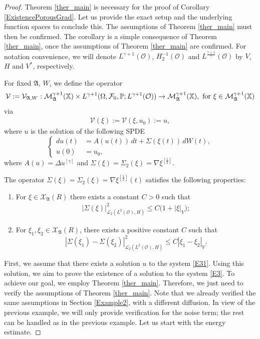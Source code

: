 \documentclass[english,a4paper,11pt]{amsart}
\theoremstyle{plain}
\theoremstyle{definition}
\theoremstyle{remark}
\numberwithin{equation}{section}
\newcommand{\MA}{\mathfrak{A}}
\newcommand{\CO}{{{ \mathcal O }}}
\newcommand{\Mcal} {{\mathcal M}}
\newcommand{\Vcal} {{\mathcal V}}
\newcommand{\Xcal} {{\mathcal X}}
\newcommand{\Afrak} {{\mathfrak A}}
\renewcommand{\P}{\mathbb{P}}
\newcommand{\X}{\mathbb{X}}
\begin{document}
\begin{proof} Theorem \ref{ther_main} is necessary for the proof of Corollary \ref{ExistencePorousGrad}. Let us provide the exact setup and the underlying function spaces to conclude this. The assumptions of Theorem \ref{ther_main} must then be confirmed. The corollary is a simple consequence of Theorem \ref{ther_main}, once the assumptions of Theorem \ref{ther_main} are confirmed. For notation convenience, we will denote $L^{\gamma+1}(\CO)$, $H_2^{-1}(\CO)$ and $L^\frac{\gamma+1}{\gamma}(\CO)$ by $V$, $H$ and $V^\ast$, respectively.
	 
For fixed $\Afrak$, $W$, we define the operator $$\Vcal:=\Vcal_{\Afrak,W}:\Mcal_{\Afrak}^{\gamma+1}(\X)\times L^{\gamma+1}(\Omega,\mathcal{F}_0,\P;L^{\gamma+1}(\CO))\break\to \Mcal_{\Afrak}^{\gamma+1}(\X), \text{ for } \xi\in \Mcal_{\Afrak}^{\gamma+1}(\X)$$ via
\begin{align*}
	\Vcal(\xi):=\Vcal(\xi,u_0):=u, 
\end{align*}where $u$ is the solution of the following SPDE
\begin{equation}\label{E31}
	\left\{
	\begin{aligned}
		d u(t)&=A(u(t))\, d t+\Sigma(\xi(t))\, dW(t), \\
		u(0)&=u_0,
	\end{aligned}
	\right.
\end{equation}where $A(u)=\Delta u^{[\gamma]}$ and {$\Sigma(\xi)=\Sigma_2(\xi)=\nabla \xi^{[\frac{1}{2}]}$}.

The operator {$\Sigma(\xi)=\Sigma_2(\xi)=\nabla \xi^{[\frac{1}{2}]}(t)$} satisfies the following properties: 
	\begin{enumerate}
	\item For $\xi\in \Xcal_\MA(R)$ there exists a constant $C>0$ such that \begin{align*}
		|\Sigma(\xi)|_{\mathcal{L}_2(L^2(\mathcal{O}),H)}^2 \leq C\big(1+|\xi|_V);
	\end{align*}
	\item For $\xi_1, \xi_2\in \Xcal_\MA(R)$, there exists a positive constant $C$ such that 
	$${ { | \Sigma(\xi_1)-\Sigma(\xi_2) | _{\mathcal{L}_2(L^2(\CO),H)}^2}\le C  | \xi_1-\xi_2 | _{V}.}
	$$
\end{enumerate}




 First, we assume that there exists a solution $u$ to the system \eqref{E31}. Using this solution, we aim to prove the existence of a solution to the system \eqref{E3}. To achieve our goal, we employ Theorem \ref{ther_main}. Therefore, we just need to verify the assumptions of Theorem \ref{ther_main}. Note that we already verified the same assumptions in Section \ref{Example2}, with a different diffusion. In view of the previous example, we will only provide verification for the noise term; the rest can be handled as in the previous example. Let us start with the energy estimate. 


\end{proof}
\end{document}
